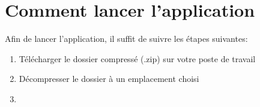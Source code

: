 \documentclass[12pt]{/home/samuel/Documents/GLO/latex/documentClass/GLO_ULAVAL}
\begin{document}
\modifyItemize{}
\maketitle

\chapter*{Comment lancer l'application}
Afin de lancer l'application, il suffit de suivre les étapes suivantes:
\begin{enumerate}
  \item Télécharger le dossier compressé (.zip) sur votre poste de travail
  \item Décompresser le dossier à un emplacement choisi
  \item 
\end{enumerate}
\end{document}
